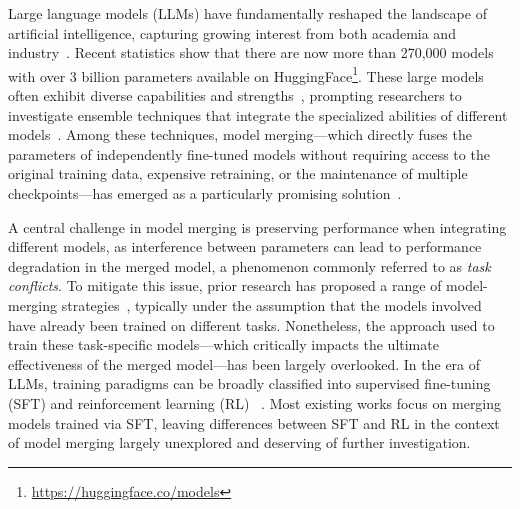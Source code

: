 \documentclass{article} %
\begin{document}
Large language models (LLMs) have fundamentally reshaped the landscape of artificial intelligence, capturing growing interest from both academia and industry~\citep{team2024qwen2, grattafiori2024llama, xiang2025survey}. Recent statistics show that there are now more than 270,000 models with over 3 billion parameters available on HuggingFace\footnote{\url{https://huggingface.co/models}}. These large models often exhibit diverse capabilities and strengths~\citep{shao2024deepseekmath, ahmad2025opencodeinstructlargescaleinstructiontuning, toshniwal2025openmathinstruct}, prompting researchers to investigate ensemble techniques that integrate the specialized abilities of different models~\citep{li2023deep, chen2025harnessing, ruan2025task}. Among these techniques, model merging—which directly fuses the parameters of independently fine-tuned models without requiring access to the original training data, expensive retraining, or the maintenance of multiple checkpoints—has emerged as a particularly promising solution~\citep{lu2024merge, yang2024modelmergingllmsmllms}.

A central challenge in model merging is preserving performance when integrating different models, as interference between parameters can lead to performance degradation in the merged model, a phenomenon commonly referred to as \emph{task conflicts}. To mitigate this issue, prior research has proposed a range of model-merging strategies~\citep{ilharco2023editingmodelstaskarithmetic, yadav2023ties, yu2024language}, typically under the assumption that the models involved have already been trained on different tasks. Nonetheless, the approach used to train these task-specific models—which critically impacts the ultimate effectiveness of the merged model—has been largely overlooked. In the era of LLMs, training paradigms can be broadly classified into supervised fine-tuning (SFT) and reinforcement learning (RL) ~\citep{hu2025openreasonerzeroopensourceapproach, deepseekai2025deepseekr1incentivizingreasoningcapability}. Most existing works focus on merging models trained via SFT, leaving differences between SFT and RL in the context of model merging largely unexplored and deserving of further investigation.
\end{document}
